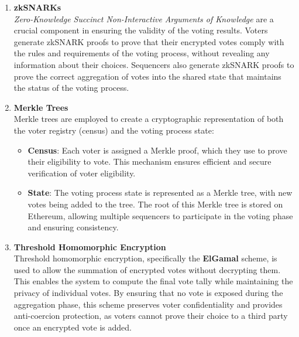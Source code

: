 
\begin{enumerate}
	\item \textbf{zkSNARKs}\\
	
	\textit{Zero-Knowledge Succinct Non-Interactive Arguments of Knowledge} are a crucial component in ensuring the validity of the voting results. Voters generate zkSNARK proofs to prove that their encrypted votes comply with the rules and requirements of the voting process, without revealing any information about their choices. Sequencers also generate zkSNARK proofs to prove the correct aggregation of votes into the shared state that maintains the status of the voting process.\\
	
	\item \textbf{Merkle Trees}\\
			
	Merkle trees are employed to create a cryptographic representation of both the voter registry (census) and the voting process state:

	\begin{itemize}
		\item \textbf{Census}: Each voter is assigned a Merkle proof, which they use to prove their eligibility to vote. This mechanism ensures efficient and secure verification of voter eligibility.
		\item \textbf{State}: The voting process state is represented as a Merkle tree, with new votes being added to the tree. The root of this Merkle tree is stored on Ethereum, allowing multiple sequencers to participate in the voting phase and ensuring consistency. 
	\end{itemize}
	
	\item \textbf{Threshold Homomorphic Encryption} \\
	
	Threshold homomorphic encryption, specifically the \textbf{ElGamal} scheme, is used to allow the summation of encrypted votes without decrypting them. This enables the system to compute the final vote tally while maintaining the privacy of individual votes. By ensuring that no vote is exposed during the aggregation phase, this scheme preserves voter confidentiality and provides anti-coercion protection, as voters cannot prove their choice to a third party once an encrypted vote is added. \\
	

\end{enumerate}
